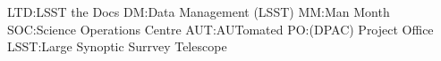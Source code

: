 LTD:LSST the Docs
DM:Data Management (LSST)
MM:Man Month
SOC:Science Operations Centre
AUT:AUTomated
PO:(DPAC) Project Office
LSST:Large Synoptic Surrvey Telescope
